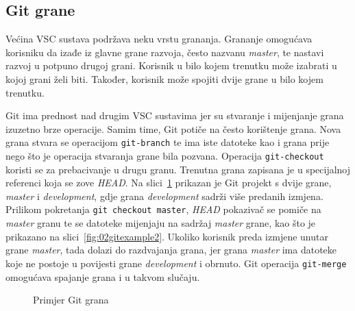 \subsection{Git grane}
Većina VSC sustava podržava neku vrstu grananja. Grananje omogućava korisniku da izađe iz glavne
grane razvoja, često nazvanu \textit{master}, te nastavi razvoj u potpuno drugoj grani. Korisnik u
bilo kojem trenutku može izabrati u kojoj grani želi biti. Također, korisnik može spojiti dvije
grane u bilo kojem trenutku.

Git ima prednost nad drugim VSC sustavima jer su stvaranje i mijenjanje grana izuzetno brze
operacije. Samim time, Git potiče na često korištenje grana. Nova grana stvara se operacijom
\texttt{git-branch} te ima iste datoteke kao i grana prije nego što je operacija stvaranja grane
bila pozvana. Operacija \texttt{git-checkout} koristi se za prebacivanje u drugu granu. Trenutna
grana zapisana je u specijalnoj referenci koja se zove \textit{HEAD}. Na
slici~\ref{fig:02gitexample} prikazan je Git projekt s dvije grane, \textit{master} i
\textit{development}, gdje grana \textit{development} sadrži više predanih izmjena. Prilikom
pokretanja \texttt{git checkout master}, \textit{HEAD} pokazivač se pomiče na \textit{master} granu
te se datoteke mijenjaju na sadržaj \textit{master} grane, kao što je prikazano na
slici~\ref{fig:02gitexample2}. Ukoliko korisnik preda izmjene unutar grane \textit{master}, tada
dolazi do razdvajanja grana, jer grana \textit{master} ima datoteke koje ne postoje u povijesti
grane \textit{development} i obrnuto. Git operacija \texttt{git-merge} omogućava spajanje grana i u
takvom slučaju.

\begin{figure}[h]
    \centering

    \caption{Primjer Git grana}%
    \label{fig:02gitexample}
\end{figure}

